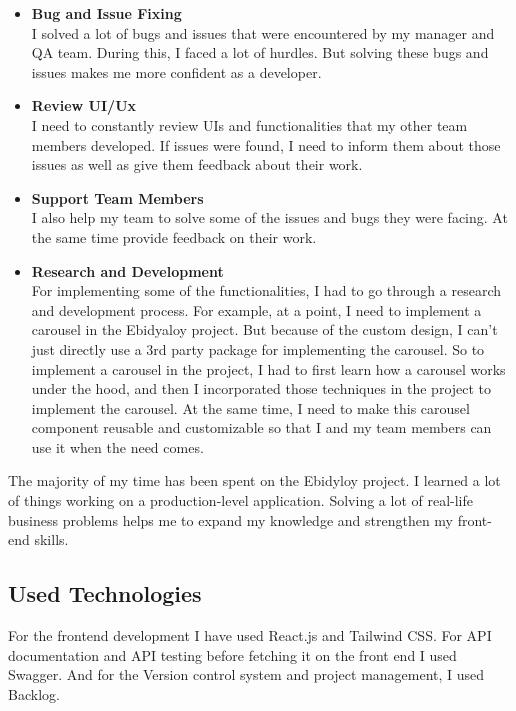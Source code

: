 \begin{flushleft}
\begin{itemize}
\item \textbf{Bug and Issue Fixing}\\
\vspace{6pt}
I solved a lot of bugs and issues that were encountered by my manager and QA team.
During this, I faced a lot of hurdles. But solving these bugs and issues makes me more
confident as a developer.
\item \textbf{Review UI/Ux}\\
\vspace{6pt}
I need to constantly review UIs and functionalities that my other team members
developed. If issues were found, I need to inform them about those issues as well as
give them feedback about their work.
\item \textbf{Support Team Members}\\
\vspace{6pt}
I also help my team to solve some of the issues and bugs they were facing. At the same
time provide feedback on their work.
\item \textbf{Research and Development}\\
\vspace{6pt}
For implementing some of the functionalities, I had to go through a research and
development process. For example, at a point, I need to implement a carousel in the
Ebidyaloy project. But because of the custom design, I can’t just directly use a 3rd party
package for implementing the carousel. So to implement a carousel in the project, I had
to first learn how a carousel works under the hood, and then I incorporated those
techniques in the project to implement the carousel. At the same time, I need to make
this carousel component reusable and customizable so that I and my team members can
use it when the need comes.\\
\end{itemize}
\vspace{6pt}
The majority of my time has been spent on the Ebidyloy project. I learned a lot of things working
on a production-level application. Solving a lot of real-life business problems helps me to
expand my knowledge and strengthen my front-end skills.\\

\subsection{Used Technologies}
\begin{flushleft}
    For the frontend development I have used React.js and
Tailwind CSS. For API documentation and API testing before fetching it on the front end I
used Swagger. And for the Version control system and project management, I used
Backlog. 
\end{flushleft}




\end{flushleft}

